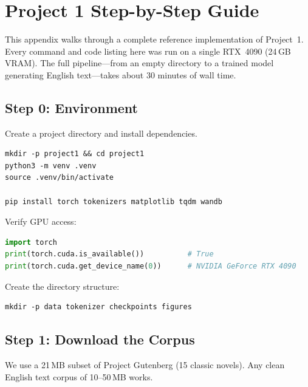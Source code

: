 \chapter{Project 1 Step-by-Step Guide}
\label{app:project1-guide}

This appendix walks through a complete reference implementation of Project~1.
Every command and code listing here was run on a single RTX~4090 (24\,GB VRAM).
The full pipeline---from an empty directory to a trained model generating English text---takes about 30 minutes of wall time.


\section{Step 0: Environment}

Create a project directory and install dependencies.

\begin{lstlisting}[language={}, caption={Environment setup}]
mkdir -p project1 && cd project1
python3 -m venv .venv
source .venv/bin/activate

pip install torch tokenizers matplotlib tqdm wandb
\end{lstlisting}

Verify GPU access:

\begin{lstlisting}[language=python, caption={GPU check}]
import torch
print(torch.cuda.is_available())          # True
print(torch.cuda.get_device_name(0))      # NVIDIA GeForce RTX 4090
\end{lstlisting}

Create the directory structure:

\begin{lstlisting}[language={}, caption={Directory structure}]
mkdir -p data tokenizer checkpoints figures
\end{lstlisting}


\section{Step 1: Download the Corpus}

We use a 21\,MB subset of Project Gutenberg (15 classic novels).
Any clean English text corpus of 10--50\,MB works.

